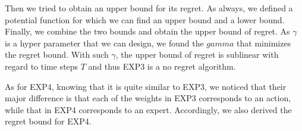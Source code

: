 \documentclass[11pt]{article}
\begin{document}
Then we tried to obtain an upper bound for its regret. As always, we defined a potential function for which we can find an upper bound and a lower bound. Finally, we combine the two bounds and obtain the upper bound of regret. As $\gamma$ is a hyper parameter that we can design, we found the $gamma$ that minimizes the regret bound. With such $\gamma$, the upper bound of regret is sublinear with regard to time steps $T$ and thus EXP3 is a no regret algorithm.

As for EXP4, knowing that it is quite similar to EXP3, we noticed that their major difference is that each of the weights in EXP3 corresponds to an action, while that in EXP4 corresponds to an expert. Accordingly, we also derived the regret bound for EXP4.



{


}




\clearpage



\end{document}
